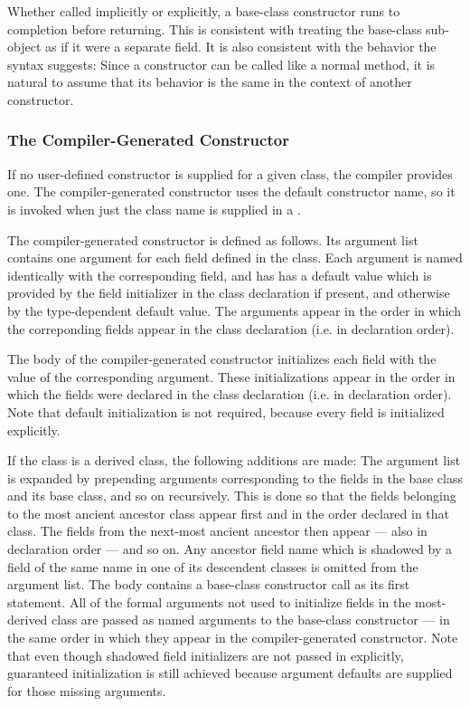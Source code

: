 Whether called implicitly or explicitly, a base-class constructor runs to
completion before returning.  This is consistent with treating the base-class
sub-object as if it were a separate field.  It is also consistent with the
behavior the syntax suggests: Since a constructor can be called like a normal
method, it is natural to assume that its behavior is the same in the context of
another constructor.

\subsubsection{The Compiler-Generated Constructor}
\label{The_Compiler_Generated_Constructor}

If no user-defined constructor is supplied for a given class, the compiler
provides one.  The compiler-generated constructor uses the default constructor
name, so it is invoked when just the class name is supplied in
a .  

The compiler-generated constructor is defined as follows.  Its argument list
contains one argument for each field defined in the class.  Each argument is
named identically with the corresponding field, and has has a default value
which is provided by the field initializer in the class declaration if present,
and otherwise by the type-dependent default value.  The arguments appear in the
order in which the correponding fields appear in the class declaration (i.e. in
declaration order).

The body of the compiler-generated
constructor initializes each field with the value of the corresponding
argument.  These initializations appear in the order in which the fields were
declared in the class declaration (i.e. in declaration order).  Note that default
initialization is not required, because every field is initialized explicitly.

If the class is a derived class, the following additions are made: The argument
list is expanded by prepending arguments corresponding to the fields in the base
class and its base class, and so on recursively.  This is done so that the
fields belonging to the most ancient ancestor class appear first and in the
order declared in that class.  The fields from the next-most ancient ancestor
then appear --- also in declaration order --- and so on.  Any ancestor field name
which is shadowed by a field of the same name in one of its descendent classes
is omitted from the argument
list.  The body contains a base-class constructor call
as its first statement.  All of the formal arguments not used to initialize
fields in the most-derived class are passed as named arguments to the
base-class constructor --- in the same order in which they appear in the
compiler-generated constructor.
Note that even though shadowed field initializers are not passed in explicitly,
guaranteed initialization is still achieved because argument defaults are
supplied for those missing arguments.


